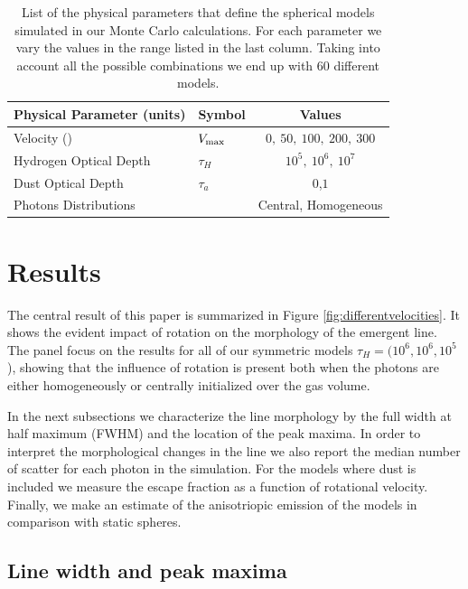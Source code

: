 \documentclass{emulateapj}
\newcommand{\ly}{{\ifmmode{{\rm Ly}\alpha~}\else{Ly$\alpha$~}\fi}}
\newcommand{\kms}{{\ifmmode{{\mathrm{\,km\ s}^{-1}}}\else{\,km~s$^{-1}$}\fi}}
\begin{document}
\begin{table}
\begin{center}
\begin{tabular}{llc}\hline\hline
Physical Parameter (units) & Symbol & Values\\\hline
Velocity (\kms) & $V_{\rm max}$&$0,\ 50,\ 100,\ 200,\ 300$\\
Hydrogen Optical Depth & $\tau_{H} $ & $10^{5},\ 10^{6},\ 10^{7}$\\
Dust Optical Depth & $\tau_{a}$ & $0$,$1$\\
Photons Distributions & & Central, Homogeneous\\\hline\hline
\end{tabular}
\caption{
  List of the physical parameters that define the spherical models 
  simulated in our Monte Carlo calculations. For each parameter we
  vary the values in the range listed in the last column. Taking into
  account all the possible combinations we end up with $60$ different
  models.} 
\label{table:models}
\end{center}
\end{table}


\section{Results}
\label{sec:results}

The central result of this paper is summarized in Figure
\ref{fig:differentvelocities}. It shows the evident
impact of rotation on the morphology of the emergent \ly line.
The panel focus on the results for all of our symmetric models
 $\tau_{H}=(10^{6}, 10^{6}, 10^{5}$), showing that the
influence of rotation is present both when the photons are either
homogeneously or centrally initialized over the gas volume.  

In the next subsections we characterize the line morphology by the
full width at half maximum (FWHM) and the location of the peak
maxima. In order to interpret the morphological changes in the line we
also report the median number of scatter for each \ly photon in the
simulation. For the models where dust is included we measure the 
escape fraction as a function of rotational velocity. Finally, we make
an estimate of the anisotriopic emission of the models in comparison
with static spheres.


\subsection{Line width and peak maxima}
\label{sec:widthpeak}
\end{document}
